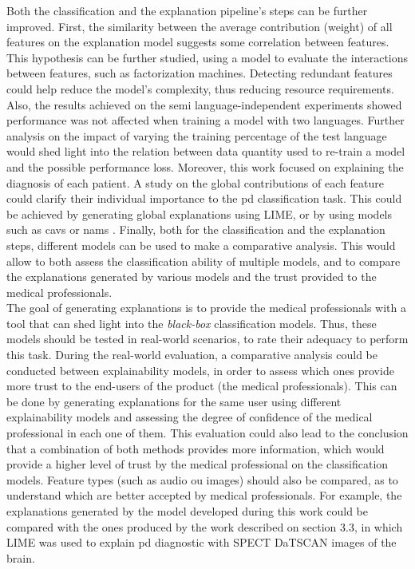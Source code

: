 Both the classification and the explanation pipeline's steps can be further improved. First, the similarity between the average contribution (weight) of all features on the explanation model suggests some correlation between features. This hypothesis can be further studied, using a model to evaluate the interactions between features, such as factorization machines. Detecting redundant features could help reduce the model's complexity, thus reducing resource requirements. Also, the results achieved on the semi language-independent experiments showed performance was not affected when training a model with two languages. Further analysis on the impact of varying the training percentage of the test language would shed light into the relation between data quantity used to re-train a model and the possible performance loss. Moreover, this work focused on explaining the diagnosis of each patient. A study on the global contributions of each feature could clarify their individual importance to the \gls{pd} classification task. This could be achieved by generating global explanations using LIME, or by using models such as \gls{cav}s \cite{TCAV} or \gls{nam}s \cite{NAM}. Finally, both for the classification and the explanation steps, different models can be used to make a comparative analysis. This would allow to both assess the classification ability of multiple models, and to compare the explanations generated by various models and the trust provided to the medical professionals. \\
The goal of generating explanations is to provide the medical professionals with a tool that can shed light into the \textit{black-box} classification models. Thus, these models should be tested in real-world scenarios, to rate their adequacy to perform this task. During the real-world evaluation, a comparative analysis could be conducted between explainability models, in order to assess which ones provide more trust to the end-users of the product (the medical professionals). This can be done by generating explanations for the same user using different explainability models and assessing the degree of confidence of the medical professional in each one of them. This evaluation could also lead to the conclusion that a combination of both methods provides more information, which would provide a higher level of trust by the medical professional on the classification models. Feature types (such as audio ou images) should also be compared, as to understand which are better accepted by medical professionals. For example, the explanations generated by the model developed during this work could be compared with the ones produced by the work described on section 3.3, in which LIME was used to explain \gls{pd} diagnostic with SPECT DaTSCAN images of the brain.


